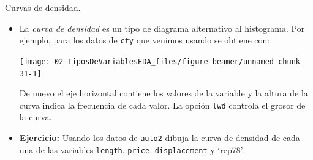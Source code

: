 \documentclass[
  9pt,
  ignorenonframetext,
]{beamer}
\newenvironment{Shaded}{\begin{snugshade}}{\end{snugshade}}
\newcommand{\DataTypeTok}[1]{\textcolor[rgb]{0.13,0.29,0.53}{#1}}
\newcommand{\DecValTok}[1]{\textcolor[rgb]{0.00,0.00,0.81}{#1}}
\newcommand{\KeywordTok}[1]{\textcolor[rgb]{0.13,0.29,0.53}{\textbf{#1}}}
\newcommand{\NormalTok}[1]{#1}
\newcommand{\OperatorTok}[1]{\textcolor[rgb]{0.81,0.36,0.00}{\textbf{#1}}}
\newcommand{\StringTok}[1]{\textcolor[rgb]{0.31,0.60,0.02}{#1}}
\begin{document}
\begin{frame}[fragile]{Curvas de densidad.}
\protect\hypertarget{curvas-de-densidad.}{}

\begin{itemize}
\item
  La \emph{curva de densidad} es un tipo de diagrama alternativo al
  histograma. Por ejemplo, para los datos de \texttt{cty} que venimos
  usando se obtiene con:

\begin{Shaded}
\end{Shaded}

  \begin{center}\texttt{[image: 02-TiposDeVariablesEDA\_files/figure-beamer/unnamed-chunk-31-1]} \end{center}

  De nuevo el eje horizontal contiene los valores de la variable y la
  altura de la curva indica la frecuencia de cada valor. La opción
  \texttt{lwd} controla el grosor de la curva.
\item
  \textbf{Ejercicio:} Usando los datos de \texttt{auto2} dibuja la curva
  de densidad de cada una de las variables \texttt{length},
  \texttt{price}, \texttt{displacement} y `rep78'.
\end{itemize}

\end{frame}
\end{document}
